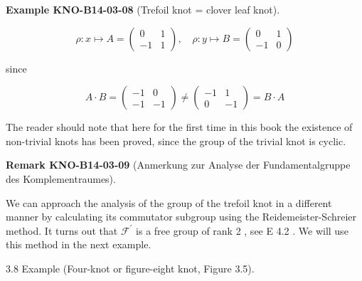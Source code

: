 \documentclass[10pt, letterpaper]{article}
\newcommand{\CustomHeading}[3]{%
  \par\medskip\noindent%
  \textbf{#1 #2} \textnormal{(#3)}.\enskip%
}
\newenvironment{REM}[2]{\begin{unitbox}\CustomHeading{Remark}{#1}{#2}}{\end{unitbox}}
\newenvironment{EXA}[2]{\begin{unitbox}\CustomHeading{Example}{#1}{#2}}{\end{unitbox}}
\begin{document}
\begin{EXA}{KNO-B14-03-08}{Trefoil knot = clover leaf knot}
$$
\rho: x \mapsto A=\left(\begin{array}{cc}
0 & 1 \\
-1 & 1
\end{array}\right), \quad \rho: y \mapsto B=\left(\begin{array}{rr}
0 & 1 \\
-1 & 0
\end{array}\right)
$$

since

$$
A \cdot B=\left(\begin{array}{rr}
-1 & 0 \\
-1 & -1
\end{array}\right) \neq\left(\begin{array}{cc}
-1 & 1 \\
0 & -1
\end{array}\right)=B \cdot A
$$

The reader should note that here for the first time in this book the existence of non-trivial knots has been proved, since the group of the trivial knot is cyclic.
\end{EXA}



\begin{REM}{KNO-B14-03-09}{Anmerkung zur Analyse der Fundamentalgruppe des Komplementraumes}
We can approach the analysis of the group of the trefoil knot in a different manner by calculating its commutator subgroup using the Reidemeister-Schreier method. It turns out that $\mathscr{F}^{\prime}$ is a free group of rank 2 , see E 4.2 . We will use this method in the next example.
\end{REM}



3.8 Example (Four-knot or figure-eight knot, Figure 3.5).
\end{document}
